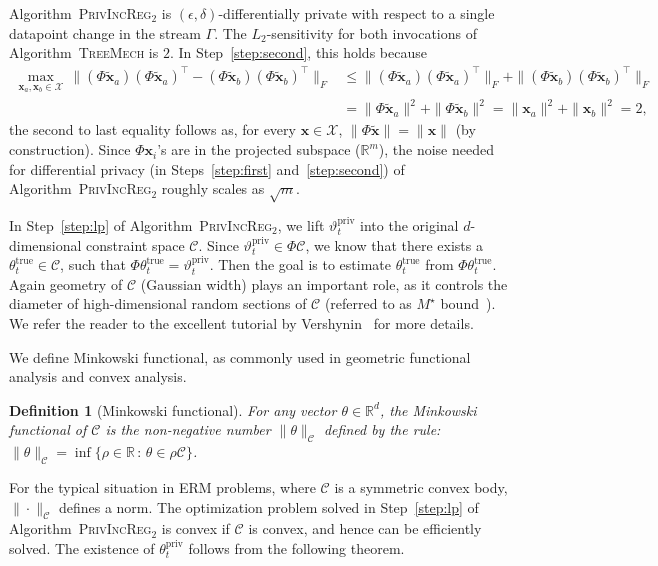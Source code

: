 \documentclass{article}
\theoremstyle{plain}
\newtheorem{definition}{Definition}
\def \TreeMech {\textsc{TreeMech}\xspace}
\def \ProjPrivIncReg {\textsc{PrivIncReg$_2$}\xspace}
\def \eps {\epsilon}
\def \CCC {\mathcal{C}}
\def \XXX {\mathcal{X}}
\def \true {{\mathrm{true}}}
\def \priv {{\mathrm{priv}}}
\def \x {\mathbf x}
\def \R {\mathbb{R}}
\begin{document}
Algorithm~\ProjPrivIncReg is $(\eps,\delta)$-differentially private with respect to a single datapoint change in the stream $\Gamma$. The $L_2$-sensitivity for both invocations of  Algorithm~\TreeMech is $2$. In Step~\ref{step:second}, this holds because
\begin{align*}
\max_{\x_a,\x_b \in \XXX}\, \| (\Phi \tilde{\x}_a)(\Phi \tilde{\x}_a)^\top - (\Phi \tilde{\x}_b)(\Phi \tilde{\x}_b)^\top \|_F & \leq \|(\Phi \tilde{\x}_a)(\Phi \tilde{\x}_a)^\top \|_F  + \| (\Phi \tilde{\x}_b)(\Phi \tilde{\x}_b)^\top \|_F \\
& = \|\Phi \tilde{\x}_a \|^2 + \|\Phi \tilde{\x}_b \|^2 = \| \x_a \|^2 + \| \x_b \|^2 = 2,
\end{align*}
the second to last equality follows as, for every $\x \in \XXX$, $\| \Phi \tilde{\x} \| =  \| \x \|$ (by construction). Since $\Phi \x_i$'s are in the projected subspace ($\R^m$), the noise needed for differential privacy (in Steps~\ref{step:first} and~\ref{step:second}) of Algorithm~\ProjPrivIncReg roughly scales as $\sqrt{m}$. 


In Step~\ref{step:lp} of Algorithm~\ProjPrivIncReg, we lift $\vartheta^\priv_t$ into the original $d$-dimensional constraint space $\CCC$. Since $\vartheta^\priv_t \in \Phi\CCC$, we know that there exists a $\theta^\true_t \in \CCC$, such that  $\Phi\theta^\true_t = \vartheta^\priv_t$. Then the goal is to estimate $\theta^\true_t$ from $\Phi\theta^\true_t$. Again geometry of $\CCC$ (Gaussian width) plays an important role, as it controls the diameter of high-dimensional random sections of $\CCC$ (referred to as $M^\star$ bound~\cite{ledoux2013probability,vershynin2014estimation}). We refer the reader to the excellent tutorial by Vershynin~\cite{vershynin2014estimation} for more details.

We define Minkowski functional, as commonly used in geometric functional analysis and convex analysis.
\begin{definition} [Minkowski functional]
For any vector $\theta \in \R^d$, the Minkowski functional of $\CCC$ is the non-negative number $\| \theta \|_\CCC$ defined by the rule: $\| \theta \|_\CCC = \inf \{\rho \in \R \,:\, \theta \in \rho \CCC \}$.
\end{definition}
For the typical situation in ERM problems, where $\CCC$ is a symmetric convex body, $\| \cdot \|_{\CCC}$ defines a norm. The optimization problem solved in Step~\ref{step:lp} of Algorithm~\ProjPrivIncReg is convex if $\CCC$ is convex, and hence can be efficiently solved. The existence of $\theta^\priv_t$ follows from the following theorem.
\end{document}
